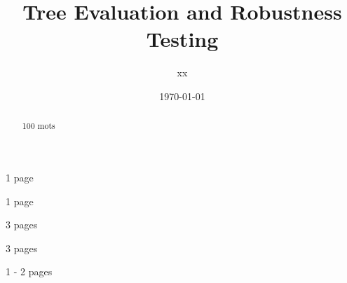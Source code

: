 \documentclass[a4paper,10pt]{article}
\title{Tree Evaluation and Robustness Testing}
\author{xx}
\begin{document}

\date{\today}
\maketitle

\begin{abstract}
100 mots
\end{abstract}

\tableofcontents

 1 page

 1 page 

 3 pages 

 3 pages

% 

 1 - 2 pages

\end{document}
